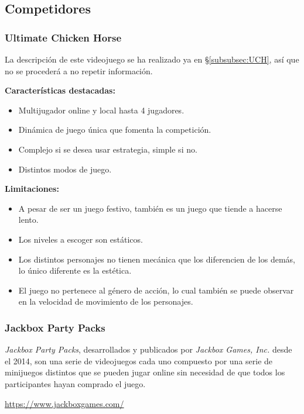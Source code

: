 \subsection{Competidores}

\subsubsection{Ultimate Chicken Horse}

La descripción de este videojuego se ha realizado ya en §\ref{subsubsec:UCH}, así
que no se procederá a no repetir información.

\textbf{Características destacadas:}
\begin{itemize}
    \item Multijugador online y local hasta 4 jugadores.
    \item Dinámica de juego única que fomenta la competición.
    \item Complejo si se desea usar estrategia, simple si no.
    \item Distintos modos de juego.
\end{itemize}

\textbf{Limitaciones:}
\begin{itemize}
    \item A pesar de ser un juego festivo, también es un juego que tiende a
    hacerse lento.
    \item Los niveles a escoger son estáticos.
    \item Los distintos personajes no tienen mecánica que los diferencien de los
    demás, lo único diferente es la estética.
    \item El juego no pertenece al género de acción, lo cual también se puede
    observar en la velocidad de movimiento de los personajes.
\end{itemize}

\subsubsection{Jackbox Party Packs}
\emph{Jackbox Party Packs}, desarrollados y publicados por \emph{Jackbox Games,
Inc.} desde el 2014, son una serie de videojuegos cada uno compuesto por una
serie de minijuegos distintos que se pueden jugar online sin necesidad de que
todos los participantes hayan comprado el juego.

\url{https://www.jackboxgames.com/}

